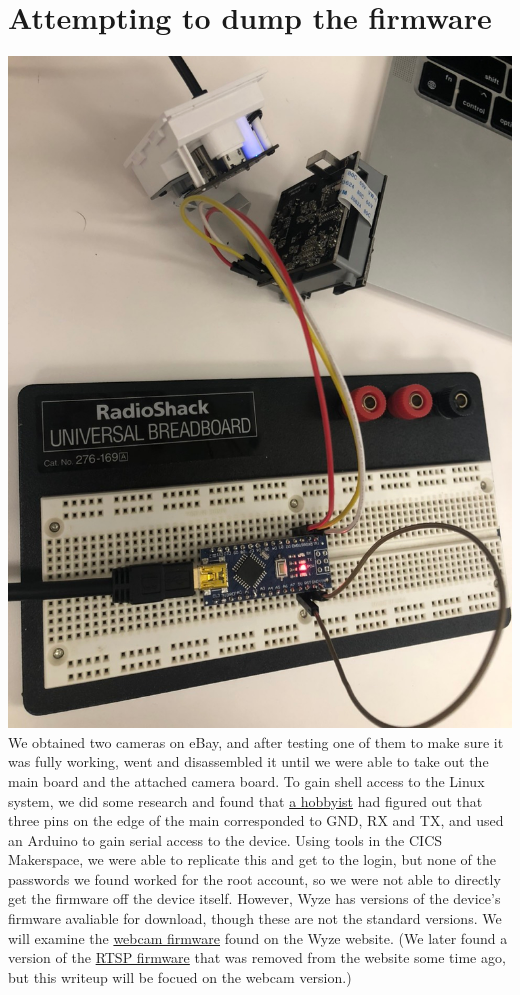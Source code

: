 \documentclass[a4paper, 11pt]{article}
\begin{document}
\section{Attempting to dump the firmware}
\includegraphics[scale=0.25]{image1}\newline
We obtained two cameras on eBay, and after testing one of them to make sure it was fully working, went and disassembled it until we were able to take out the main board and the attached camera board. 
To gain shell access to the Linux system, we did some research and found that \href{https://davidmac.pro/posts/2021-07-06-wyzecamv2-1-firmware/}{a hobbyist} had figured out that three pins on the edge of the main corresponded to GND, RX and TX, and used an Arduino to gain serial access to the device. Using tools in the CICS Makerspace, we were able to replicate this and get to the login, but none of the passwords we found worked for the root account, so we were not able to directly get the firmware off the device itself. However, Wyze has versions of the device's firmware avaliable for download, though these are not the standard versions. We will examine the \href{https://davidmac.pro/posts/2021-07-06-wyzecamv2-1-firmware/}{webcam firmware} found on the Wyze website. (We later found a version of the \href{https://archive.org/details/wyze_cam_rtsp_demo_bin}{RTSP firmware} that was removed from the website some time ago, but this writeup will be focued on the webcam version.)
\end{document}
